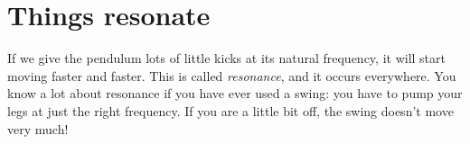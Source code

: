 \documentclass{article}
\begin{document}
\section*{Things resonate}
If we give the pendulum lots of little kicks at its natural frequency,
it will start moving faster and faster.  This is called {\it
resonance}, and it occurs everywhere.  You know a lot about resonance
if you have ever used a swing: you have to pump your legs at just the
right frequency.  If you are a little bit off, the swing doesn't move
very much!
\end{document}
